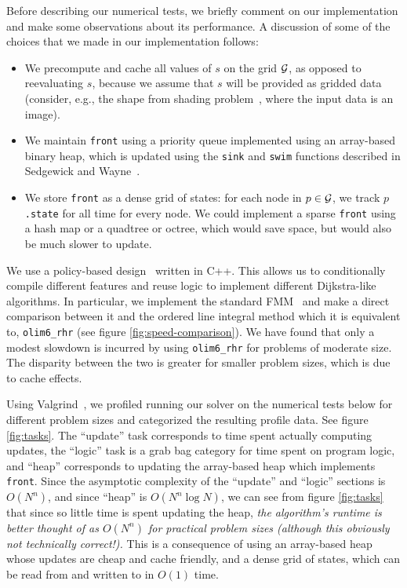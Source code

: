 \documentclass[smallcondensed]{svjour3}
\begin{document}
Before describing our numerical tests, we briefly comment on our
implementation and make some observations about its performance. A
discussion of some of the choices that we made in our implementation
follows:
\begin{itemize}
\item We precompute and cache all values of $s$ on the grid $\mathcal{G}$,
  as opposed to reevaluating $s$, because we assume that $s$ will be
  provided as gridded data (consider, e.g., the shape from shading
  problem~\cite{kimmel2001optimal}, where the input data is an image).
\item We maintain \texttt{front} using a priority queue implemented
  using an array-based binary heap, which is updated using the
  \texttt{sink} and \texttt{swim} functions described in Sedgewick and
  Wayne~\cite{sedgewick2011algorithms}.
\item We store \texttt{front} as a dense grid of states: for each node
  in $p \in \mathcal{G}$, we track $p$\texttt{.state} for all time for every
  node. We could implement a sparse \texttt{front} using a hash map or
  a quadtree or octree, which would save space, but would also be much
  slower to update.
\end{itemize}

We use a policy-based design~\cite{alexandrescu2001modern} written in
C++. This allows us to conditionally compile different features and
reuse logic to implement different Dijkstra-like algorithms. In
particular, we implement the standard FMM~\cite{sethian1996fast} and
make a direct comparison between it and the ordered line integral
method which it is equivalent to, \texttt{olim6\_rhr} (see figure
\ref{fig:speed-comparison}). We have found that only a modest slowdown
is incurred by using \texttt{olim6\_rhr} for problems of moderate
size. The disparity between the two is greater for smaller problem
sizes, which is due to cache effects.

Using Valgrind~\cite{nethercote2007valgrind}, we profiled running our
solver on the numerical tests below for different problem sizes and
categorized the resulting profile data. See figure
\ref{fig:tasks}. The ``update'' task corresponds to time spent
actually computing updates, the ``logic'' task is a grab bag category
for time spent on program logic, and ``heap'' corresponds to updating
the array-based heap which implements \texttt{front}. Since the
asymptotic complexity of the ``update'' and ``logic'' sections is
$O(N^n)$, and since ``heap'' is $O(N^n \log N)$, we can see from
figure \ref{fig:tasks} that since so little time is spent updating the
heap, \emph{the algorithm's runtime is better thought of as $O(N^n)$
  for practical problem sizes (although this obviously not technically
  correct!).} This is a consequence of using an array-based heap whose
updates are cheap and cache friendly, and a dense grid of states,
which can be read from and written to in $O(1)$ time.
\end{document}
